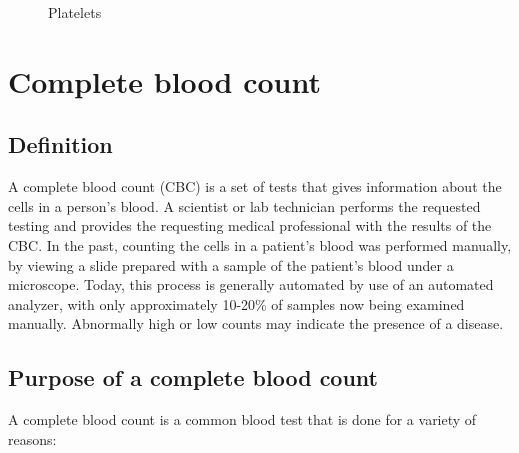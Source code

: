\vspace{0.2in}

\begin{figure}[h]
\centering
  \vspace{-0.1in}
    \centerline{}
    \caption{Platelets}
\end{figure}

\section{Complete blood count}
\subsection{Definition}

A complete blood count (CBC) is a set of tests that gives information about the cells in a person's blood. A scientist or lab technician performs the requested testing and provides the requesting medical professional with the results of the CBC. In the past, counting the cells in a patient's blood was performed manually, by viewing a slide prepared with a sample of the patient's blood under a microscope. Today, this process is generally automated by use of an automated analyzer, with only approximately 10-20\% of samples now being examined manually. Abnormally high or low counts may indicate the presence of a disease.\\

\subsection{Purpose of a complete blood count}

A complete blood count is a common blood test that is done for a variety of reasons:

